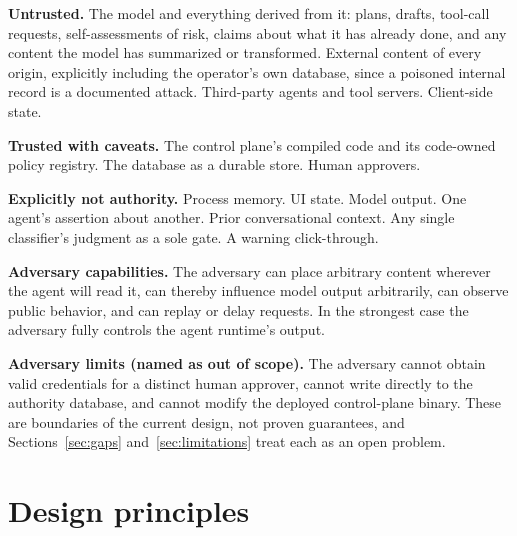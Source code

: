 \documentclass[11pt,letterpaper]{article}
\begin{document}
\textbf{Untrusted.} The model and everything derived from it: plans, drafts, tool-call requests, self-assessments of risk, claims about what it has already done, and any content the model has summarized or transformed. External content of every origin, explicitly including the operator's own database, since a poisoned internal record is a documented attack. Third-party agents and tool servers. Client-side state.

\textbf{Trusted with caveats.} The control plane's compiled code and its code-owned policy registry. The database as a durable store. Human approvers.

\textbf{Explicitly not authority.} Process memory. UI state. Model output. One agent's assertion about another. Prior conversational context. Any single classifier's judgment as a sole gate. A warning click-through.

\textbf{Adversary capabilities.} The adversary can place arbitrary content wherever the agent will read it, can thereby influence model output arbitrarily, can observe public behavior, and can replay or delay requests. In the strongest case the adversary fully controls the agent runtime's output.

\textbf{Adversary limits (named as out of scope).} The adversary cannot obtain valid credentials for a distinct human approver, cannot write directly to the authority database, and cannot modify the deployed control-plane binary. These are boundaries of the current design, not proven guarantees, and Sections~\ref{sec:gaps} and~\ref{sec:limitations} treat each as an open problem.

\section{Design principles}\label{sec:principles}
\end{document}
